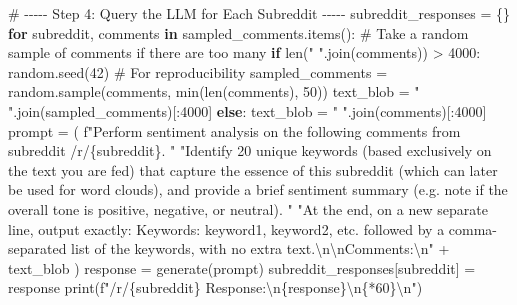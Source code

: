 \documentclass[
  12pt,
  letterpaper,
  DIV=11,
  numbers=noendperiod,
  abstract]{scrartcl}
\newenvironment{Shaded}{\begin{snugshade}}{\end{snugshade}}
\newcommand{\BuiltInTok}[1]{\textcolor[rgb]{0.00,0.23,0.31}{#1}}
\newcommand{\CharTok}[1]{\textcolor[rgb]{0.13,0.47,0.30}{#1}}
\newcommand{\CommentTok}[1]{\textcolor[rgb]{0.37,0.37,0.37}{#1}}
\newcommand{\ControlFlowTok}[1]{\textcolor[rgb]{0.00,0.23,0.31}{\textbf{#1}}}
\newcommand{\DecValTok}[1]{\textcolor[rgb]{0.68,0.00,0.00}{#1}}
\newcommand{\KeywordTok}[1]{\textcolor[rgb]{0.00,0.23,0.31}{\textbf{#1}}}
\newcommand{\NormalTok}[1]{\textcolor[rgb]{0.00,0.23,0.31}{#1}}
\newcommand{\OperatorTok}[1]{\textcolor[rgb]{0.37,0.37,0.37}{#1}}
\newcommand{\SpecialCharTok}[1]{\textcolor[rgb]{0.37,0.37,0.37}{#1}}
\newcommand{\SpecialStringTok}[1]{\textcolor[rgb]{0.13,0.47,0.30}{#1}}
\newcommand{\StringTok}[1]{\textcolor[rgb]{0.13,0.47,0.30}{#1}}
\begin{document}
\begin{Shaded}
\begin{Highlighting}[]
\CommentTok{\# {-}{-}{-}{-}{-} Step 4: Query the LLM for Each Subreddit {-}{-}{-}{-}{-}}
\NormalTok{subreddit\_responses }\OperatorTok{=}\NormalTok{ \{\}}
\ControlFlowTok{for}\NormalTok{ subreddit, comments }\KeywordTok{in}\NormalTok{ sampled\_comments.items():}
    \CommentTok{\# Take a random sample of comments if there are too many}
    \ControlFlowTok{if} \BuiltInTok{len}\NormalTok{(}\StringTok{" "}\NormalTok{.join(comments)) }\OperatorTok{\textgreater{}} \DecValTok{4000}\NormalTok{:}
\NormalTok{        random.seed(}\DecValTok{42}\NormalTok{)  }\CommentTok{\# For reproducibility}
\NormalTok{        sampled\_comments }\OperatorTok{=}\NormalTok{ random.sample(comments, }\BuiltInTok{min}\NormalTok{(}\BuiltInTok{len}\NormalTok{(comments), }\DecValTok{50}\NormalTok{))}
\NormalTok{        text\_blob }\OperatorTok{=} \StringTok{" "}\NormalTok{.join(sampled\_comments)[:}\DecValTok{4000}\NormalTok{]}
    \ControlFlowTok{else}\NormalTok{:}
\NormalTok{        text\_blob }\OperatorTok{=} \StringTok{" "}\NormalTok{.join(comments)[:}\DecValTok{4000}\NormalTok{]}
\NormalTok{    prompt }\OperatorTok{=}\NormalTok{ (}
        \SpecialStringTok{f"Perform sentiment analysis on the following comments from subreddit /r/}\SpecialCharTok{\{}\NormalTok{subreddit}\SpecialCharTok{\}}\SpecialStringTok{. "}
        \StringTok{"Identify 20 unique keywords (based exclusively on the text you are fed) that capture the essence of this subreddit (which can later be used for word clouds), and provide a brief sentiment summary (e.g. note if the overall tone is positive, negative, or neutral). "}
        \StringTok{"At the end, on a new separate line, output exactly: \textquotesingle{}Keywords: keyword1, keyword2, etc.\textquotesingle{} followed by a comma{-}separated list of the keywords, with no extra text.}\CharTok{\textbackslash{}n\textbackslash{}n}\StringTok{Comments:}\CharTok{\textbackslash{}n}\StringTok{"} 
        \OperatorTok{+}\NormalTok{ text\_blob}
\NormalTok{    )}
\NormalTok{    response }\OperatorTok{=}\NormalTok{ generate(prompt)}
\NormalTok{    subreddit\_responses[subreddit] }\OperatorTok{=}\NormalTok{ response}
    \BuiltInTok{print}\NormalTok{(}\SpecialStringTok{f"/r/}\SpecialCharTok{\{}\NormalTok{subreddit}\SpecialCharTok{\}}\SpecialStringTok{ Response:}\CharTok{\textbackslash{}n}\SpecialCharTok{\{}\NormalTok{response}\SpecialCharTok{\}}\CharTok{\textbackslash{}n}\SpecialCharTok{\{}\StringTok{\textquotesingle{}{-}\textquotesingle{}}\OperatorTok{*}\DecValTok{60}\SpecialCharTok{\}}\CharTok{\textbackslash{}n}\SpecialStringTok{"}\NormalTok{)}


\end{Highlighting}
\end{Shaded}
\end{document}

